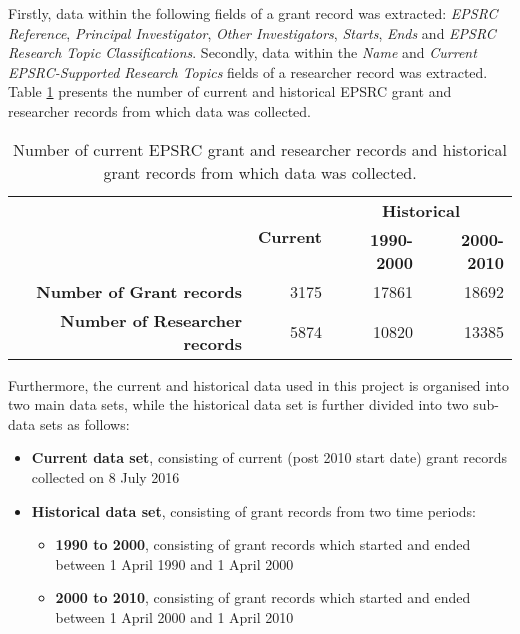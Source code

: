 Firstly, data within the following fields of a grant record was extracted:
\textit{EPSRC Reference}, \textit{Principal Investigator}, \textit{Other Investigators}, \textit{Starts}, \textit{Ends} and \textit{EPSRC Research Topic Classifications}. Secondly, data within the \textit{Name} and \textit{Current EPSRC-Supported Research Topics} fields of a researcher record was extracted.  Table \ref{table:grant_researcher_record_numbers} presents the number of current and historical EPSRC grant and researcher records from which data was collected.

\begin{table}[!htbp]
\renewcommand*{\arraystretch}{1.4}
\centering
\caption{Number of current EPSRC grant and researcher records and historical grant records from which data was collected.}
\label{table:grant_researcher_record_numbers}
\begin{tabular}{r|r|r|r}
{} & \multirow{2}{*}{\textbf{Current}}
& \multicolumn{2}{c}{\textbf{Historical}}\\
\cline{3-4}
& {} & \textbf{1990-2000} & \textbf{2000-2010}\\
\hline
\textbf{Number of Grant records}      & {3175} & {17861} & {18692}\\
\textbf{Number of Researcher records} & {5874} & {10820} & {13385}\\
\end{tabular}
\end{table}

\clearpage

\noindent Furthermore, the current and historical data used in this project is organised into two main data sets, while the historical data set is further divided into two sub-data sets as follows:

\begin{itemize}[noitemsep]
    \item \textbf{Current data set}, consisting of current (post 2010 start date) grant records collected on 8 July 2016 
    \item \textbf{Historical data set}, consisting of grant records from two time periods:
    \begin{itemize}
        \item \textbf{1990 to 2000}, consisting of grant records which started and ended between 1 April 1990 and 1 April 2000
        \item \textbf{2000 to 2010}, consisting of grant records which started and ended between 1 April 2000 and 1 April 2010
    \end{itemize}
\end{itemize}


